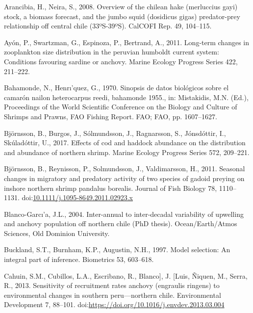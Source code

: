 \documentclass[12pt]{article}
\begin{document}
\leavevmode\hypertarget{ref-ArancibiaNeira2008}{}%
Arancibia, H., Neira, S., 2008. Overview of the chilean hake (merluccius
gayi) stock, a biomass forecast, and the jumbo squid (dosidicus gigas)
predator-prey relationship off central chile (33ºS-39ºS). CalCOFI Rep.
49, 104--115.

\leavevmode\hypertarget{ref-Ayon2011}{}%
Ayón, P., Swartzman, G., Espinoza, P., Bertrand, A., 2011. Long-term
changes in zooplankton size distribution in the peruvian humboldt
current system: Conditions favouring sardine or anchovy. Marine Ecology
Progress Series 422, 211--222.

\leavevmode\hypertarget{ref-Bahamonde:1970}{}%
Bahamonde, N., Henrı'quez, G., 1970. Sinopsis de datos biológicos sobre
el camarón nailon heterocarpus reedi, bahamonde 1955., in: Mistakidis,
M.N. (Ed.), Proceedings of the World Scientific Conference on the
Biology and Culture of Shrimps and Prawns, FAO Fishing Report. FAO; FAO,
pp. 1607--1627.

\leavevmode\hypertarget{ref-B:2017aa}{}%
Björnsson, B., Burgos, J., Sólmundsson, J., Ragnarsson, S., Jónsdóttir,
I., Skúladóttir, U., 2017. Effects of cod and haddock abundance on the
distribution and abundance of northern shrimp. Marine Ecology Progress
Series 572, 209--221.

\leavevmode\hypertarget{ref-Bjornsson2011}{}%
Björnsson, B., Reynisson, P., Solmundsson, J., Valdimarsson, H., 2011.
Seasonal changes in migratory and predatory activity of two species of
gadoid preying on inshore northern shrimp pandalus borealis. Journal of
Fish Biology 78, 1110--1131.
doi:\href{https://doi.org/10.1111/j.1095-8649.2011.02923.x}{10.1111/j.1095-8649.2011.02923.x}

\leavevmode\hypertarget{ref-Blanco2004}{}%
Blanco-Garcı'a, J.L., 2004. Inter-annual to inter-decadal variability of
upwelling and anchovy population off northern chile (PhD thesis).
Ocean/Earth/Atmos Sciences, Old Dominion University.

\leavevmode\hypertarget{ref-Buckland1997}{}%
Buckland, S.T., Burnham, K.P., Augustin, N.H., 1997. Model selection: An
integral part of inference. Biometrics 53, 603--618.

\leavevmode\hypertarget{ref-CAHUIN201388}{}%
Cahuin, S.M., Cubillos, L.A., Escribano, R., Blanco{]}, J. {[}Luis,
Ñiquen, M., Serra, R., 2013. Sensitivity of recruitment rates anchovy
(engraulis ringens) to environmental changes in southern peru---northern
chile. Environmental Development 7, 88--101.
doi:\href{https://doi.org/https://doi.org/10.1016/j.envdev.2013.03.004}{https://doi.org/10.1016/j.envdev.2013.03.004}
\end{document}
